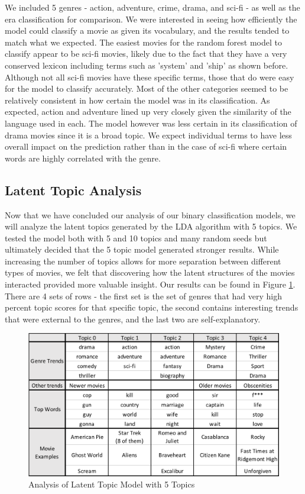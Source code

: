 \documentclass{article} %
\begin{document}
We included 5 genres - action, adventure, crime, drama, and sci-fi - as well as the era classification for comparison. We were interested in seeing how efficiently the model could classify a movie as given its vocabulary, and the results tended to match what we expected. The easiest movies for the random forest model to classify appear to be sci-fi movies, likely due to the fact that they have a very conserved lexicon including terms such as 'system' and 'ship' as shown before. Although not all sci-fi movies have these specific terms, those that do were easy for the model to classify accurately. Most of the other categories seemed to be relatively consistent in how certain the model was in its classification. As expected, action and adventure lined up very closely given the similarity of the language used in each. The model however was less certain in its classification of drama movies since it is a broad topic. We expect individual terms to have less overall impact on the prediction rather than in the case of sci-fi where certain words are highly correlated with the genre.

\subsection{Latent Topic Analysis}

Now that we have concluded our analysis of our binary classification models, we will analyze the latent topics generated by the LDA algorithm with 5 topics. We tested the model both with 5 and 10 topics and many random seeds but ultimately decided that the 5 topic model generated stronger results. While increasing the number of topics allows for more separation between different types of movies, we felt that discovering how the latent structures of the movies interacted provided more valuable insight. Our results can be found in Figure \ref{lda_data}. There are 4 sets of rows - the first set is the set of genres that had very high percent topic scores for that specific topic, the second contains interesting trends that were external to the genres, and the last two are self-explanatory.

\begin{figure}[htb]
\centering
\includegraphics[width=0.8\linewidth]{lda} 
\caption{Analysis of Latent Topic Model with 5 Topics}
\label{lda_data}
\end{figure}
 
\end{document}
